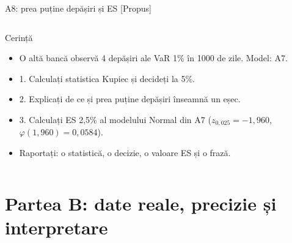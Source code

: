 \begin{frame}{A8: prea puține depășiri și ES [Propus]}
\propsub
\itemsize{\scriptsize}
\begin{columns}[T]
\begin{column}{\taskw}
\begin{block}{Cerință}
\begin{itemize}
    \item O altă bancă observă 4 depășiri ale VaR 1\% în 1000 de zile. Model: A7.
    \item 1. Calculați statistica Kupiec și decideți la 5\%.
    \item 2. Explicați de ce și prea puține depășiri înseamnă un eșec.
    \item 3. Calculați ES 2,5\% al modelului Normal din A7 ($z_{0{,}025} = -1{,}960$, $\varphi(1{,}960) = 0{,}0584$).
    \item Raportați: o statistică, o decizie, o valoare ES și o frază.
\end{itemize}
\end{block}
\end{column}
\begin{column}{\solw}
\end{column}
\end{columns}
\end{frame}


\section{Partea B: date reale, precizie și interpretare}

